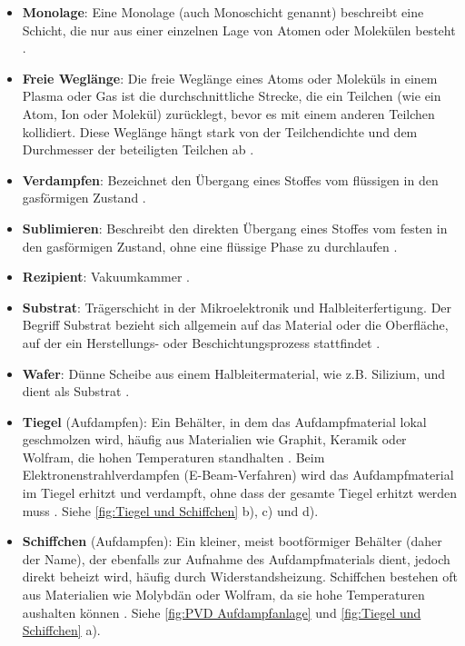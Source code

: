 \documentclass{article} %
\begin{document}
\begin{itemize}
    \item \textbf{Monolage}: Eine Monolage (auch Monoschicht genannt) beschreibt eine Schicht, die nur aus einer einzelnen Lage von Atomen oder Molekülen besteht \cite{kittel2004}.
    \item \textbf{Freie Weglänge}: Die freie Weglänge eines Atoms oder Moleküls in einem Plasma oder Gas ist die durchschnittliche Strecke, die ein Teilchen (wie ein Atom, Ion oder Molekül) zurücklegt, bevor es mit einem anderen Teilchen kollidiert. Diese Weglänge hängt stark von der Teilchendichte und dem Durchmesser der beteiligten Teilchen ab \cite{kittel2004}.
    \item \textbf{Verdampfen}: Bezeichnet den Übergang eines Stoffes vom flüssigen in den gasförmigen Zustand \cite{kittel2004}.
    \item \textbf{Sublimieren}: Beschreibt den direkten Übergang eines Stoffes vom festen in den gasförmigen Zustand, ohne eine flüssige Phase zu durchlaufen \cite{kittel2004}.
    \item \textbf{Rezipient}: Vakuumkammer \cite{keplinger2024, ohring2002}.
    \item \textbf{Substrat}: Trägerschicht in der Mikroelektronik und Halbleiterfertigung. Der Begriff Substrat bezieht sich allgemein auf das Material oder die Oberfläche, auf der ein Herstellungs- oder Beschichtungsprozess stattfindet \cite{ohring2002}.
    \item \textbf{Wafer}: Dünne Scheibe aus einem Halbleitermaterial, wie z.B. Silizium, und dient als Substrat \cite{sze2006}.
    \item \textbf{Tiegel} (Aufdampfen): Ein Behälter, in dem das Aufdampfmaterial lokal geschmolzen wird, häufig aus Materialien wie Graphit, Keramik oder Wolfram, die hohen Temperaturen standhalten \cite{smith1995, ohring2002}. Beim Elektronenstrahlverdampfen (E-Beam-Verfahren) wird das Aufdampfmaterial im Tiegel erhitzt und verdampft, ohne dass der gesamte Tiegel erhitzt werden muss \cite{smith1995}. Siehe \autoref{fig:Tiegel und Schiffchen} b), c) und d).
    \item \textbf{Schiffchen} (Aufdampfen): Ein kleiner, meist bootförmiger Behälter (daher der Name), der ebenfalls zur Aufnahme des Aufdampfmaterials dient, jedoch direkt beheizt wird, häufig durch Widerstandsheizung. Schiffchen bestehen oft aus Materialien wie Molybdän oder Wolfram, da sie hohe Temperaturen aushalten können \cite{mattox2010handbook, ohring2002}. Siehe \autoref{fig:PVD Aufdampfanlage} und \autoref{fig:Tiegel und Schiffchen} a).

\end{itemize}
\end{document}
